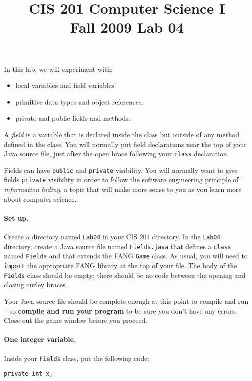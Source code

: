 \documentclass[11pt]{memoir}
\title{CIS 201 Computer Science I\\Fall 2009 Lab #1}%
\newenvironment{Activity}[1]
{%
\vspace{2ex}
\begin{Exercise}[name={Activity},title={#1}]%
}
{%
\end{Exercise}
\vspace{2ex}
}
\newcommand{\lab}[1]{%
\title{CIS 201 Computer Science I\\Fall 2009 Lab #1}%
\maketitle%
}
\begin{document}
\lab{04}

In this lab, we will experiment with:
\begin{itemize}
\item local variables and field variables.
\item primitive data types and object references.
\item private and public fields and methods.

\end{itemize}

\begin{Activity}{All methods in the class can access fields}

A {\em field} is a variable that is declared
inside the class but outside of any method defined in the class.
You will normally put field declarations
near the top of your Java source file,
just after the open brace following your \texttt{class} declaration.

Fields can have \texttt{public} and \texttt{private} visibility.
You will normally want to give fields \texttt{private} visibility
in order to follow the software engineering principle
of {\em information hiding},
a topic that will make more sense to you
as you learn more about computer science.

\paragraph{Set up.}
Create a directory named \texttt{Lab04} in your CIS 201 directory.
In the \texttt{Lab04} directory,
create a Java source file named \texttt{Fields.java}
that defines a \texttt{class} named \texttt{Fields}
and that extends the FANG \texttt{Game} class.
As usual, you will need to \texttt{import} the appropriate FANG library
at the top of your file.
The body of the \texttt{Fields} class should be empty:
there should be no code between the opening and closing curley braces.

Your Java source file should be complete enough at this point
to compile and run --
so \textbf{compile and run your program}
to be sure you don't have any errors.
Close out the game window before you proceed.

\paragraph{One integer variable.}
Inside your \texttt{Fields} class,
put the following code:

\begin{lstlisting}
private int x;


\end{lstlisting}
\end{Activity}
\end{document}
